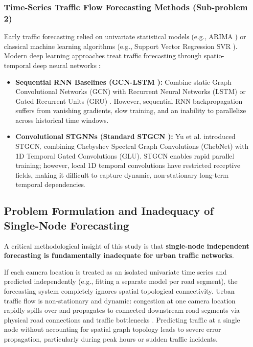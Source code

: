 \subsubsection{Time-Series Traffic Flow Forecasting Methods (Sub-problem 2)}
Early traffic forecasting relied on univariate statistical models (e.g., ARIMA \cite{arima}) or classical machine learning algorithms (e.g., Support Vector Regression SVR \cite{svr}). Modern deep learning approaches treat traffic forecasting through spatio-temporal deep neural networks \cite{dcrnn, wavenet, gman, agcrn, gnn_survey}:
\begin{itemize}
    \item \textbf{Sequential RNN Baselines (GCN-LSTM \cite{gcn, tgcn}):} Combine static Graph Convolutional Networks (GCN) \cite{gcn} with Recurrent Neural Networks (LSTM) or Gated Recurrent Units (GRU) \cite{tgcn}. However, sequential RNN backpropagation suffers from vanishing gradients, slow training, and an inability to parallelize across historical time windows.
    \item \textbf{Convolutional STGNNs (Standard STGCN \cite{stgcn}):} Yu et al. \cite{stgcn} introduced STGCN, combining Chebyshev Spectral Graph Convolutions (ChebNet) \cite{chebnet} with 1D Temporal Gated Convolutions (GLU). STGCN enables rapid parallel training; however, local 1D temporal convolutions have restricted receptive fields, making it difficult to capture dynamic, non-stationary long-term temporal dependencies.
\end{itemize}

\subsection{Problem Formulation and Inadequacy of Single-Node Forecasting}

A critical methodological insight of this study is that \textbf{single-node independent forecasting is fundamentally inadequate for urban traffic networks}.

If each camera location is treated as an isolated univariate time series and predicted independently (e.g., fitting a separate model per road segment), the forecasting system completely ignores spatial topological connectivity. Urban traffic flow is non-stationary and dynamic: congestion at one camera location rapidly spills over and propagates to connected downstream road segments via physical road connections and traffic bottlenecks \cite{ctm}. Predicting traffic at a single node without accounting for spatial graph topology leads to severe error propagation, particularly during peak hours or sudden traffic incidents.

